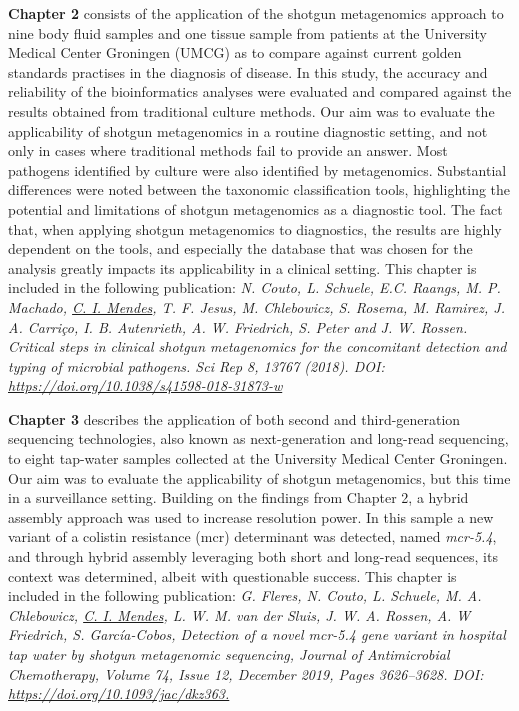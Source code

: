 \textbf{Chapter 2} consists of the application of the shotgun metagenomics approach to nine body fluid samples and one tissue sample from patients at the University Medical Center Groningen (UMCG) as to compare against current golden standards practises in the diagnosis of disease. In this study, the accuracy and reliability of the bioinformatics analyses were evaluated and compared against the results obtained from traditional culture methods. Our aim was to evaluate the applicability of shotgun metagenomics in a routine diagnostic setting, and not only in cases where traditional methods fail to provide an answer. Most pathogens identified by culture were also identified by metagenomics. Substantial differences were noted between the taxonomic classification tools, highlighting the potential and limitations of shotgun metagenomics as a diagnostic tool. The fact that, when applying shotgun metagenomics to diagnostics, the results are highly dependent on the tools, and especially the database that was chosen for the analysis greatly impacts its applicability in a clinical setting. This chapter is included in the following publication:\textit{ N. Couto, L. Schuele, E.C. Raangs, M. P. Machado, \underline{C. I. Mendes}, T. F. Jesus, M. Chlebowicz,  S. Rosema, M. Ramirez, J. A. Carriço, I. B. Autenrieth, A. W. Friedrich, S. Peter and J. W. Rossen. Critical steps in clinical shotgun metagenomics for the concomitant detection and typing of microbial pathogens. Sci Rep 8, 13767 (2018). DOI: \url{https://doi.org/10.1038/s41598-018-31873-w}}

\textbf{Chapter 3} describes the application of both second and third-generation sequencing technologies, also known as next-generation and long-read sequencing, to eight tap-water samples collected at the University Medical Center Groningen. Our aim was to evaluate the applicability of shotgun metagenomics, but this time in a surveillance setting. Building on the findings from Chapter 2, a hybrid assembly approach was used to increase resolution power. In this sample a new variant of a colistin resistance (mcr) determinant was detected, named \textit{mcr-5.4}, and through hybrid assembly leveraging both short and long-read sequences, its context was determined, albeit with questionable success. This chapter is included in the following publication: \textit{G. Fleres, N. Couto, L. Schuele, M. A. Chlebowicz, \underline{C. I. Mendes}, L. W. M. van der Sluis, J. W. A. Rossen, A. W Friedrich, S. García-Cobos, Detection of a novel mcr-5.4 gene variant in hospital tap water by shotgun metagenomic sequencing, Journal of Antimicrobial Chemotherapy, Volume 74, Issue 12, December 2019, Pages 3626–3628.  DOI: \url{https://doi.org/10.1093/jac/dkz363.}}

